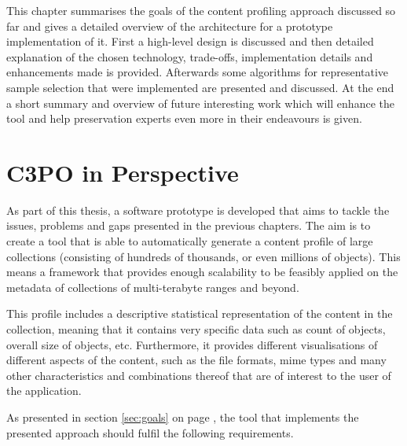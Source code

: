 This chapter summarises the goals of the content profiling approach discussed so far and gives a detailed overview of the architecture for a prototype implementation of it. First a high-level design is discussed and then detailed explanation of the chosen technology, trade-offs, implementation details and enhancements made is provided. Afterwards some algorithms for representative sample selection that were implemented are presented and discussed. At the end a short summary and overview of future interesting work which will enhance the tool and help preservation experts even more in their endeavours is given.

\section{C3PO in Perspective}
As part of this thesis, a software prototype is developed that aims to tackle the issues, problems and gaps presented in the previous chapters. The aim is to create a tool that is able to automatically generate a content profile of large collections (consisting of hundreds of thousands, or even millions of objects). This means a framework that provides enough scalability to be feasibly applied on the metadata of collections of multi-terabyte ranges and beyond.

This profile includes a descriptive statistical representation of the content in the collection, meaning that it contains very specific data such as count of objects, overall size of objects, etc. Furthermore, it provides different visualisations of different aspects of the content, such as the file formats, mime types and many other characteristics and combinations thereof that are of interest to the user of the application.

As presented in section \ref{sec:goals} on page \pageref{sec:goals}, the tool that implements the presented approach should fulfil the following requirements.

